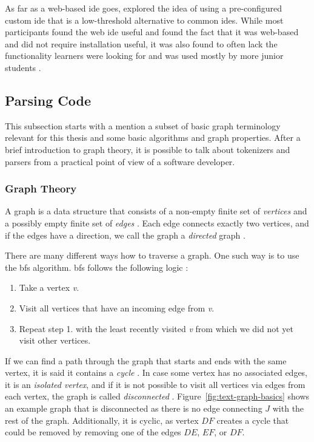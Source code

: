 As far as a web-based \gls{ide} goes, \textcite{valez_student_2020} explored the idea of using a pre-configured custom \gls{ide} that is a low-threshold alternative to common \glspl{ide}.
While most participants found the web \gls{ide} useful and found the fact that it was web-based and did not require installation useful, it was also found to often lack the functionality learners were looking for and was used mostly by more junior students \parencite{valez_student_2020}.

\subsection{Parsing Code}

This subsection starts with a mention a subset of basic graph terminology relevant for this thesis and some basic algorithms and graph properties.
After a brief introduction to graph theory, it is possible to talk about tokenizers and parsers from a practical point of view of a software developer.

\subsubsection{Graph Theory}

A graph is a data structure that consists of a non-empty finite set of \emph{vertices} and a possibly empty finite set of \emph{edges} \parencite{wilson_graph_2009}.
Each edge connects exactly two vertices, and if the edges have a direction, we call the graph a \emph{directed} graph \parencite{wilson_graph_2009}.

There are many different ways how to traverse a graph.
One such way is to use the \gls{bfs} algorithm.
\gls{bfs} follows the following logic \parencite{wilson_graph_2009}:

\begin{enumerate}
    \item Take a vertex \emph{v}.
    \item Visit all vertices that have an incoming edge from \emph{v}.
    \item Repeat step 1. with the least recently visited \emph{v} from which we did not yet visit other vertices.
\end{enumerate}

If we can find a path through the graph that starts and ends with the same vertex, it is said it contains a \emph{cycle} \parencite{wilson_graph_2009}.
In case some vertex has no associated edges, it is an \emph{isolated vertex}, and if it is not possible to visit all vertices via edges from each vertex, the graph is called \emph{disconnected} \parencite{wilson_graph_2009}.
Figure~\ref{fig:text-graph-basics} shows an example graph that is disconnected as there is no edge connecting $J$ with the rest of the graph.
Additionally, it is cyclic, as vertex $DF$ creates a cycle that could be removed by removing one of the edges $DE$, $EF$, or $DF$.

